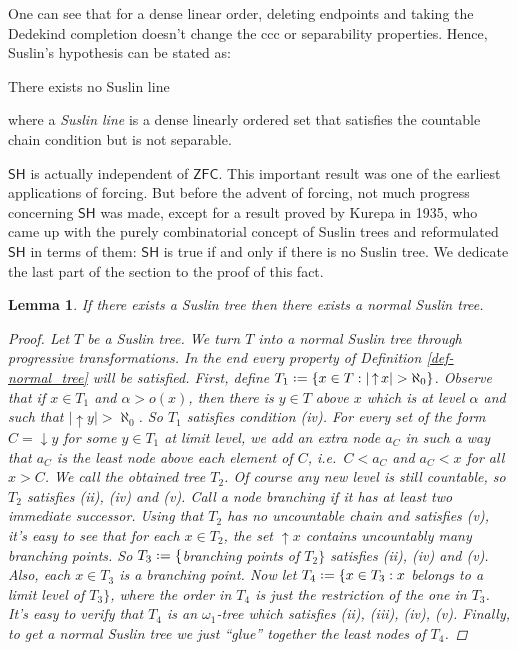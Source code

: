 \documentclass[11pt,a4paper]{report}
\newtheorem{lemma}[theorem]{Lemma}
\theoremstyle{definition}
\theoremstyle{num.custom-title}
\theoremstyle{custom-title}
\DeclareMathOperator{\down}{\downarrow}
\DeclareMathOperator{\up}{\uparrow}
\newcommand{\ZFC}{\ensuremath{\mathsf{ZFC}}\xspace}
\newcommand{\SH}{\ensuremath{\mathsf{SH}}\xspace}
\newcommand*{\defeq}{\mathrel{\rlap{%
                     \raisebox{0.3ex}{$\cdot$}}%
                     \raisebox{-0.3ex}{$\cdot$}}%
                     =}
\begin{document}
One can see that for a dense linear order, deleting endpoints and taking the Dedekind completion doesn't change the ccc or separability properties. Hence, Suslin's hypothesis can be stated as:
\begin{center}
There exists no Suslin line
\end{center}
where a \emph{Suslin line} is a dense linearly ordered set that satisfies the countable chain condition but is not separable.

\SH is actually independent of \ZFC. This important result was one of the earliest applications of forcing. But before the advent of forcing, not much progress concerning \SH was made, except for a result proved by Kurepa \cite{Kur1935} in 1935, who came up with the purely combinatorial concept of Suslin trees and reformulated \SH in terms of them: \SH is true if and only if there is no Suslin tree. We dedicate the last part of the section to the proof of this fact.

\begin{lemma}
If there exists a Suslin tree then there exists a normal Suslin tree.
\begin{proof}
Let $T$ be a Suslin tree. We turn $T$ into a normal Suslin tree through progressive transformations. In the end every property of Definition \ref{def-normal_tree} will be satisfied. First, define $T_1 \defeq \{x \in T : |\up x| > \aleph_0\}$. Observe that if $x \in T_1$ and $\alpha > o(x)$, then there is $y \in T$ above $x$ which is at level $\alpha$ and such that $|\up y| > \aleph_0$. So $T_1$ satisfies condition (iv). For every set of the form $C = \down y$ for some $y \in T_1$ at limit level, we add an extra node $a_C$ in such a way that $a_C$ is the least node above each element of $C$, i.e.\ $C < a_C$ and $a_C < x$ for all $x > C$. We call the obtained tree $T_2$. Of course any new level is still countable, so $T_2$ satisfies (ii), (iv) and (v). Call a node \emph{branching} if it has at least two immediate successor. Using that $T_2$ has no uncountable chain and satisfies (v), it's easy to see that for each $x \in T_2$, the set $\up x$ contains uncountably many branching points. So $T_3 \defeq\{$branching points of $T_2\}$ satisfies (ii), (iv) and (v). Also, each $x \in T_3$ is a branching point. Now let $T_4 \defeq \{x \in T_3 : x$ belongs to a limit level of $T_3\}$, where the order in $T_4$ is just the restriction of the one in $T_3$. It's easy to verify that $T_4$ is an $\omega_1$-tree which satisfies (ii), (iii), (iv), (v). Finally, to get a normal Suslin tree we just ``glue'' together the least nodes of $T_4$.
\end{proof}
\end{lemma}
\end{document}
